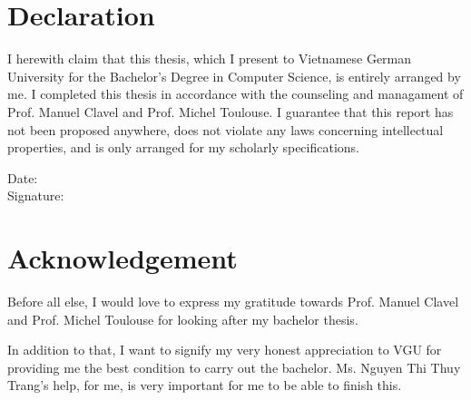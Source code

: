 \documentclass[a4paper, 11pt,openany]{book} %
\begin{document}
\pagestyle{plain}


\noindent
\section*{Declaration}
I herewith claim that this thesis, which I present to Vietnamese German University for the Bachelor's Degree in Computer Science, is entirely arranged by me. I completed this thesis in accordance with the counseling and managament of Prof. Manuel Clavel and Prof. Michel Toulouse. I guarantee that this report has not been proposed anywhere, does not violate any laws concerning intellectual properties, and is only arranged for my scholarly specifications.


Date: \\ 
Signature: 
\clearpage
\section*{Acknowledgement}
Before all else, I would love to express my gratitude towards Prof. Manuel Clavel and Prof. Michel Toulouse for looking after my bachelor thesis.\par
In addition to that, I want to signify my very honest appreciation to VGU for providing me the best condition to carry out the bachelor. Ms. Nguyen Thi Thuy Trang's help, for me, is very important for me to be able to finish this.


\clearpage

\tableofcontents
\end{document}
